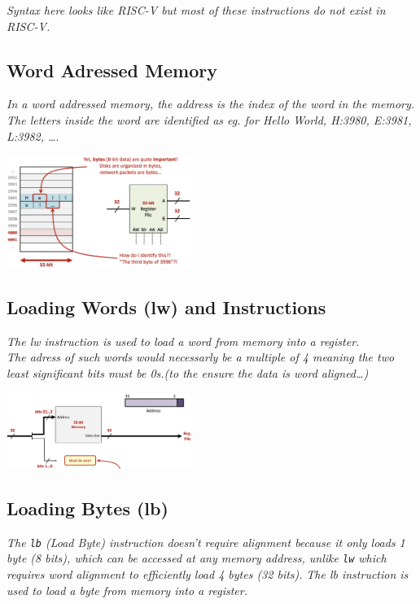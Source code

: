 \textit{Syntax here looks like RISC-V but most of these instructions do not exist in RISC-V.}
\newpage
\subsection{Word Adressed Memory}
\textit{In a word addressed memory, the address is the index of the word in the memory.} \\ 
\textit{The letters inside the word are identified as eg. for Hello World, H:3980, E:3981, L:3982, \dots}.
\begin{center}
    \includegraphics[width=0.45\textwidth]{chapters/chapter1c/images/word_add.png}
\end{center}

\subsection{Loading Words (lw) and Instructions}
\textit{The lw instruction is used to load a word from memory into a register.} \\ 
\textit{The adress of such words would necessarly be a multiple of 4 meaning the two least significant bits must be 0s.(to the ensure the data is word aligned\dots)} \\ 
\begin{center}
    \includegraphics[width=0.45\textwidth]{chapters/chapter1c/images/lw.png}
\end{center}
\subsection{Loading Bytes (lb)}
\textit{The \texttt{lb} (Load Byte) instruction doesn't require alignment because it only loads 1 byte (8 bits), which can be accessed at any memory address, unlike \texttt{lw} which requires word alignment to efficiently load 4 bytes (32 bits).
}\textit{The lb instruction is used to load a byte from memory into a register.} \\ 

